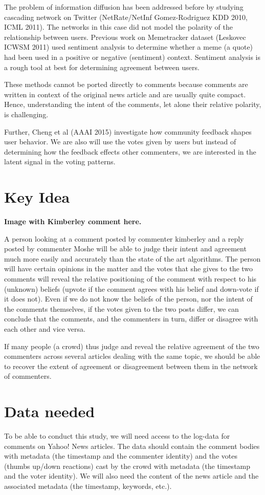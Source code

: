 \documentclass[11pt]{article}
\begin{document}
The problem of information diffusion has been addressed before by studying cascading network on Twitter (NetRate/NetInf Gomez-Rodriguez KDD 2010, ICML 2011). The networks in this case did not model the polarity of the relationship between users. Previous work on Memetracker dataset (Leskovec ICWSM 2011) used sentiment analysis to determine whether a meme (\ie a quote) had been used in a positive or negative (sentiment) context. Sentiment analysis is a rough tool at best for determining agreement between users.

These methods cannot be ported directly to comments because comments are written in context of the original news article and are usually quite compact. Hence, understanding the intent of the comments, let alone their relative polarity, is challenging.

Further, Cheng et al (AAAI 2015) investigate how community feedback shapes user behavior. We are also will use the votes given by users but instead of determining how the feedback effects other commenters, we are interested in the latent signal in the voting patterns.

\section{Key Idea}

\begin{center}
  \textbf{Image with Kimberley comment here.}
\end{center}

A person looking at a comment posted by commenter kimberley and a reply posted by commenter Moshe will be able to judge their intent and agreement much more easily and accurately than the state of the art algorithms. The person will have certain opinions in the matter and the votes that she gives to the two comments will reveal the relative positioning of the comment with respect to his (unknown) beliefs (\ie upvote if the comment agrees with his belief and down-vote if it does not). Even if we do not know the beliefs of the person, nor the intent of the comments themselves, if the votes given to the two posts differ, we can conclude that the comments, and the commenters in turn, differ or disagree with each other and vice versa.

If many people (\ie a crowd) thus judge and reveal the relative agreement of the two commenters across several articles dealing with the same topic, we should be able to recover the extent of agreement or disagreement between them in the network of commenters.

\section{Data needed}

To be able to conduct this study, we will need access to the log-data for comments on Yahoo! News articles. The data should contain the comment bodies with metadata (\ie the timestamp and the commenter identity) and the votes (thumbs up/down reactions) cast by the crowd with metadata (\ie the timestamp and the voter identity). We will also need the content of the news article and the associated metadata (\ie the timestamp, keywords, etc.).
\end{document}
